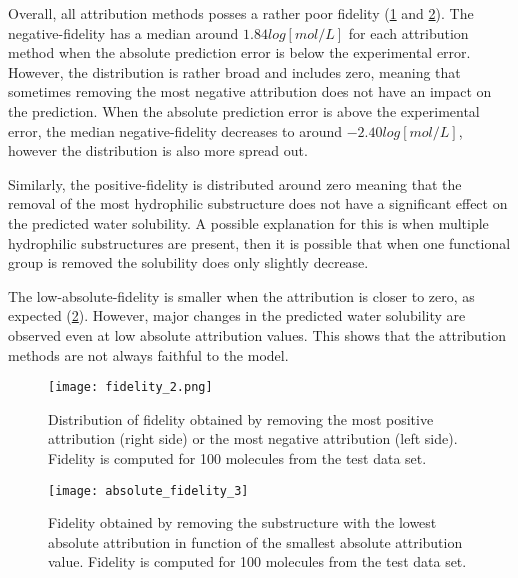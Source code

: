 Overall, all attribution methods posses a rather poor fidelity (\cref{fig:fidelity} and \cref{fig:absolute_fidelity}). 
The negative-fidelity has a median around $1.84 log[mol/L]$ for each attribution method when the absolute 
prediction error is below the experimental error. However, the distribution is rather 
broad and includes zero, meaning that sometimes removing the most negative attribution 
does not have an impact on the prediction. When the absolute prediction error is above 
the experimental error, the median negative-fidelity decreases to around $-2.40 log[mol/L]$, 
however the distribution is also more spread out. 


Similarly, the positive-fidelity is distributed around zero meaning that the removal of 
the most hydrophilic substructure does not have a significant effect on the predicted 
water solubility. A possible explanation for this is when multiple hydrophilic substructures 
are present, then it is possible that when one functional group is removed the solubility 
does only slightly decrease. 

The low-absolute-fidelity is smaller when the attribution is closer to zero, as expected (\cref{fig:absolute_fidelity}).
However, major changes in the predicted water solubility are observed even at low absolute 
attribution values. This shows that the attribution methods are not always faithful to the model. 


\begin{figure}[h]
    \centering
    \texttt{[image: fidelity\_2.png]}
    \caption{Distribution of fidelity obtained by removing the most positive 
        attribution (right side) or the most negative attribution (left side).
        Fidelity is computed for 100 molecules from the test data set.
    }
    \label{fig:fidelity}
\end{figure}


\begin{figure}[h]
    \centering
    \texttt{[image: absolute\_fidelity\_3]}
    \caption{Fidelity obtained by removing the substructure 
        with the lowest absolute attribution in function of the smallest absolute attribution value.
        Fidelity is computed for 100 molecules from the test data set.
    }
    \label{fig:absolute_fidelity}
\end{figure}

